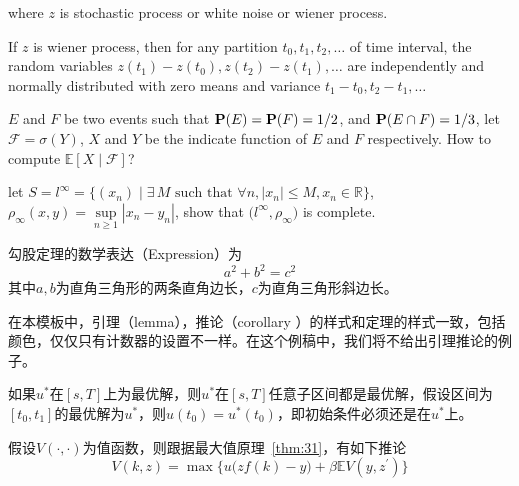 \documentclass[mathpazo,titlestyle=hang,11pt]{elegantbook}
\begin{document}
where $z$ is stochastic process or white noise or wiener process.

\begin{edefinition}
If $z$ is wiener process, then for any partition $t_0,t_1,t_2,\ldots$ of time interval, the random variables $z(t_1)-z(t_0),z(t_2)-z(t_1),\ldots$ are independently and normally distributed with zero means and variance $t_1-t_0,t_2-t_1,\ldots$
\end{edefinition}

\lipsum[5]

\begin{example}
$E$ and $F$ be two events such that $\mathbf{P}(E)=\mathbf{P}(F)=1/2$, and $\mathbf{P}(E\cap F)=1/3$, let $\mathscr{F}=\sigma(Y)$,  $X$ and $Y$ be the indicate function of $E$ and $F$ respectively. How to compute $\mathbb{E}[ X\mid \mathscr{F} ]$?
\end{example}
\lipsum[4]
\begin{exercise}
let $S=l^\infty=\big\{(x_n)\mid \exists\, M \text{ such that } \forall n, |x_n|\leq M,x_n\in \mathbb{R}\big\}$, $\rho_{\infty}(x,y)=\sup\limits_{n\geq 1}|x_n-y_n|$, show that $\big(l^\infty,\rho_{\infty}\big)$ is complete.
\end{exercise}

\begin{etheorem}[勾股定理]\label{thm:31}
勾股定理的数学表达（Expression）为
\[a^2+b^2=c^2\]
其中$a,b$为直角三角形的两条直角边长，$c$为直角三角形斜边长。
\end{etheorem}

\begin{note}
在本模板中，引理（lemma），推论（corollary ）的样式和定理的样式一致，包括颜色，仅仅只有计数器的设置不一样。在这个例稿中，我们将不给出引理推论的例子。
\end{note}


\lipsum[4]

\begin{eproposition}[最优性原理]
如果$u^*$在$[s,T]$上为最优解，则$u^*$在$[s,T]$任意子区间都是最优解，假设区间为$[t_0,t_1]$的最优解为$u^*$，则$u(t_0)=u^{*}(t_0)$，即初始条件必须还是在$u^*$上。
\end{eproposition}

\lipsum[5-6]
\begin{ecorollary}
假设$V(\cdot,\cdot)$为值函数，则跟据最大值原理~\ref{thm:31}，有如下推论
\[
V(k,z)=\max\Big\{u\big(zf(k)-y\big)+\beta \mathbb{E}V(y,z^\prime)\Big\}
\]
\end{ecorollary}
\end{document}
